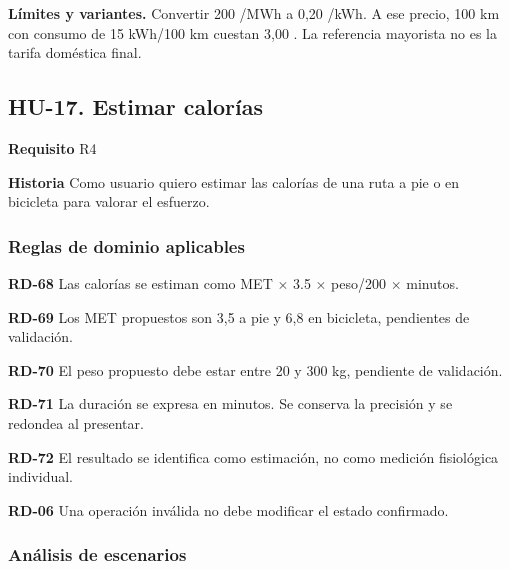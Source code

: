 {\fontsize{9}{11.8}\selectfont\textbf{Límites y variantes.} Convertir 200 \texteuro{}/MWh a 0,20 \texteuro{}/kWh. A ese precio, 100 km con consumo de 15 kWh/100 km cuestan 3,00 \texteuro{}. La referencia mayorista no es la tarifa doméstica final.\par}\vspace{4pt}
\clearpage\subsection*{HU-17. Estimar calorías}

\textbf{Requisito} R4\par

\textbf{Historia} Como usuario quiero estimar las calorías de una ruta a pie o en bicicleta para valorar el esfuerzo.\par

\subsubsection*{Reglas de dominio aplicables}

\textbf{RD-68} Las calorías se estiman como MET \(\times\) 3.5 \(\times\) peso/200 \(\times\) minutos.\par

\textbf{RD-69} Los MET propuestos son 3,5 a pie y 6,8 en bicicleta, pendientes de validación.\par

\textbf{RD-70} El peso propuesto debe estar entre 20 y 300 kg, pendiente de validación.\par

\textbf{RD-71} La duración se expresa en minutos. Se conserva la precisión y se redondea al presentar.\par

\textbf{RD-72} El resultado se identifica como estimación, no como medición fisiológica individual.\par

\textbf{RD-06} Una operación inválida no debe modificar el estado confirmado.\par

\subsubsection*{Análisis de escenarios}

